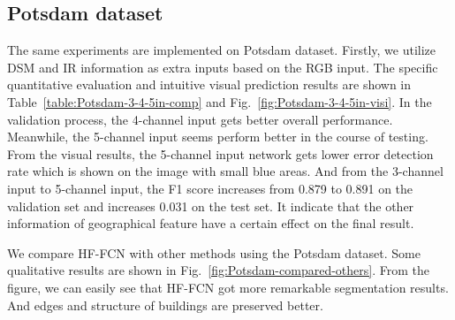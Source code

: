 \subsection{Potsdam dataset}
 The same experiments are implemented on Potsdam dataset. Firstly, we utilize DSM and IR information as extra inputs based on the RGB input. The specific quantitative evaluation and intuitive visual prediction results are shown in Table~\ref{table:Potsdam-3-4-5in-comp} and Fig.~\ref{fig:Potsdam-3-4-5in-visi}. In the validation process, the 4-channel input gets better overall performance. Meanwhile, the 5-channel input seems perform better in the course of testing. From the visual results, the 5-channel input network gets lower error detection rate which is shown on the image with small blue areas. And from the 3-channel input to 5-channel input, the F1 score increases from 0.879 to 0.891 on the validation set and increases 0.031 on the test set. It indicate that the other information of geographical feature have a certain effect on the final result.

 We compare HF-FCN with other methods using the Potsdam dataset. Some qualitative results are shown in Fig.~\ref{fig:Potsdam-compared-others}.
 From the figure, we can easily see that HF-FCN got more remarkable segmentation results. And edges and structure of buildings are preserved better.

